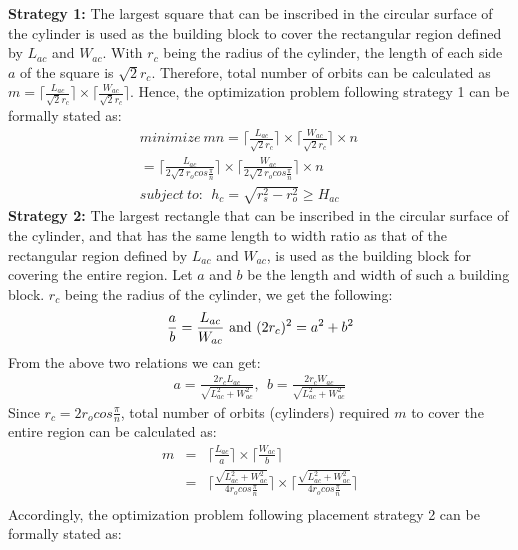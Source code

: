 \documentclass[10pt]{IEEEtran}
\begin{document}
\noindent
{\bf Strategy 1:} The largest square that can be inscribed in the circular surface of the cylinder is used as the building block to cover the rectangular region defined by $L_{ac}$ and $W_{ac}$. With $r_{c}$ being the radius of the cylinder, the length of each side $a$ of the square is $\sqrt{2}r_{c}$. Therefore, total number of orbits can be calculated as $m=\lceil \frac{L_{ac}}{\sqrt{2}r_{c}}\rceil \times \lceil \frac{W_{ac}}{\sqrt{2}r_{c}}\rceil$. Hence, the optimization problem following strategy 1 can be formally stated as:
\begin{eqnarray}
minimize~mn  =  \lceil \frac{L_{ac}}{\sqrt{2}r_{c}}\rceil \times \lceil \frac{W_{ac}}{\sqrt{2}r_{c}}\rceil \times n &&\nonumber \\
= \lceil \frac{L_{ac}}{2\sqrt{2}r_{o}cos\frac{\pi}{n}}\rceil \times \lceil \frac{W_{ac}}{2\sqrt{2}r_{o}cos\frac{\pi}{n}}\rceil \times n &&\label{eq:s1obj} \\
subject~to:~~h_{c}  = \sqrt{r_{s}^{2} - r_{o}^{2}} \geq  H_{ac} && \label{eq:s1cons}
\end{eqnarray}
{\bf Strategy 2:} The largest rectangle that can be inscribed in the circular surface of the cylinder, and that has the same length to width ratio as that of the rectangular region defined by $L_{ac}$ and $W_{ac}$, is used as the building block for covering the entire region. Let $a$ and $b$ be the length and width of such a building block.  $r_{c}$ being the radius of the cylinder, we get the following:
\begin{eqnarray*}
\frac{a}{b} = \frac{L_{ac}}{W_{ac}} \textnormal{    and     }(2r_{c})^{2} = a^{2} + b^{2}
\end{eqnarray*}
From the above two relations we can get:
\begin{eqnarray*}
a = \frac{2r_{c}L_{ac}}{\sqrt{L_{ac}^{2} + W_{ac}^{2}}},~~b = \frac{2r_{c}W_{ac}}{\sqrt{L_{ac}^{2} + W_{ac}^{2}}}
\end{eqnarray*}
Since $r_{c} = 2r_{o}cos\frac{\pi}{n}$, total number of orbits (cylinders) required $m$ to cover the entire region can be calculated as:
\begin{eqnarray*}
m & = & \lceil \frac{L_{ac}}{a} \rceil \times \lceil \frac{W_{ac}}{b} \rceil \\
& = & \lceil \frac{\sqrt{L_{ac}^{2} + W_{ac}^{2}}}{4r_{o}cos\frac{\pi}{n}} \rceil \times \lceil \frac{\sqrt{L_{ac}^{2} + W_{ac}^{2}}}{4r_{o}cos\frac{\pi}{n}} \rceil\\
\end{eqnarray*}
Accordingly, the optimization problem following placement strategy 2 can be formally stated as:
\end{document}
